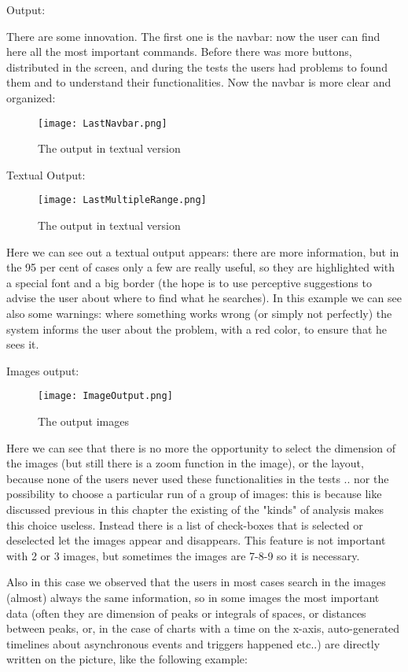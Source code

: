 Output: 

There are some innovation. The first one is the navbar: now the user can find here all the most important commands. Before there was more buttons, distributed in the screen, and during the tests the users had problems to found them and to understand their functionalities. Now the navbar is more clear and organized:

\begin{figure}[H]
\centering
\texttt{[image: LastNavbar.png]} 
\caption{The output in textual version}
\end{figure}  


Textual Output:

\begin{figure}[H]
\centering
\texttt{[image: LastMultipleRange.png]} 
\caption{The output in textual version}
\end{figure}  

Here we can see out a textual output appears: there are more information, but in the 95 per cent of cases only a few are really useful, so they are highlighted with a special font and a big border (the hope is to use perceptive suggestions to advise the user about where to find what he searches). In this example we can see also some warnings: where something works wrong (or simply not perfectly) the system informs the user about the problem, with a red color, to ensure that he sees it. 

Images output:

\begin{figure}[H]
\centering
\texttt{[image: ImageOutput.png]} 
\caption{The output images}
\end{figure}  

Here we can see that there is no more the opportunity to select the dimension of the images (but still there is a zoom function in the image), or the layout, because none of the users never used these functionalities in the tests .. nor the possibility to choose a particular run of a group of images: this is because like discussed previous in this chapter the existing of the "kinds" of analysis makes this choice useless. Instead there is a list of check-boxes that is selected or deselected let the images appear and disappears. This feature is not important with 2 or 3 images, but sometimes the images are 7-8-9 so it is necessary.

Also in this case we observed that the users in most cases search in the images (almost) always the same information, so in some images the most important data (often they are dimension of peaks or integrals of spaces, or distances between peaks, or, in the case of charts with a time on the x-axis, auto-generated timelines about asynchronous events and triggers happened etc..) are directly written on the picture, like the following example:

